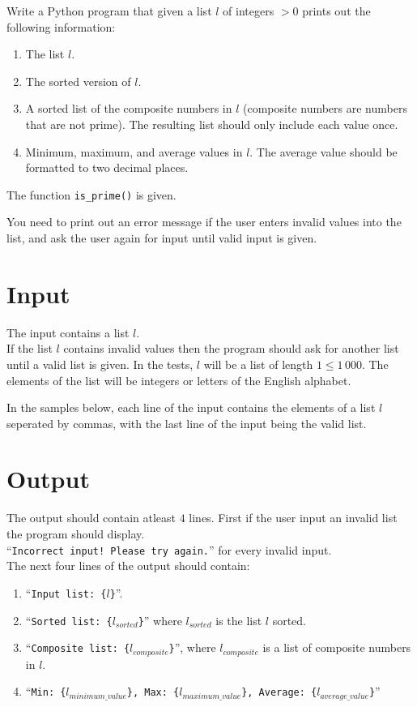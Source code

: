 
Write a Python program that given a list $l$ of integers $> 0$ prints out the following information:
\begin{enumerate}
    \item The list $l$.
    \item The sorted version of $l$.
    \item A sorted list of the composite numbers in $l$ (composite numbers are numbers that are not prime). 
        The resulting list should only include each value once.
    \item Minimum, maximum, and average values in $l$. The average value should be formatted to two decimal places.
\end{enumerate}

The function \texttt{is\_prime()} is given.

You need to print out an error message if the user enters invalid values into the list,
and ask the user again for input until valid input is given.

\section*{Input}
The input contains a list $l$.\\
If the list $l$ contains invalid values then the program should ask for another list until a valid list is given.
In the tests, $l$ will be a list of length $1 \leq 1\,000$.
The elements of the list will be integers or letters of the English alphabet.

In the samples below,
each line of the input contains the elements of a list $l$ seperated by commas,
with the last line of the input being the valid list.

\section*{Output}

The output should contain atleast $4$ lines.
First if the user input an invalid list the program should display.\\
``\texttt{Incorrect input! Please try again.}'' for every invalid input.\\
The next four lines of the output should contain:
\begin{enumerate}
    \item ``\texttt{Input list: \{$l$\}}''.
    \item ``\texttt{Sorted list: \{$l_{sorted}$\}}'' where $l_{sorted}$ is the list $l$ sorted.
    \item ``\texttt{Composite list: \{$l_{composite}$\}}'', where $l_{composite}$ is a list of composite numbers in $l$.
    \item ``\texttt{Min: \{$l_{minimum\_value}$\}, Max: \{$l_{maximum\_value}$\}, Average: \{$l_{average\_value}$\}}''
\end{enumerate}
